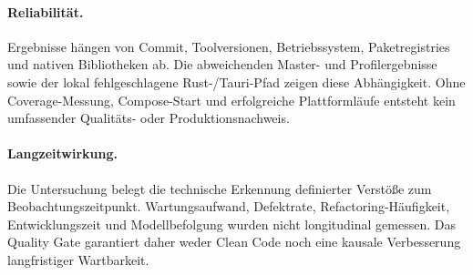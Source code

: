 \paragraph{Reliabilität.}
Ergebnisse hängen von Commit, Toolversionen, Betriebssystem, Paketregistries
und nativen Bibliotheken ab. Die abweichenden Master- und Profilergebnisse
sowie der lokal fehlgeschlagene Rust-/Tauri-Pfad zeigen diese Abhängigkeit.
Ohne Coverage-Messung, Compose-Start und erfolgreiche Plattformläufe entsteht
kein umfassender Qualitäts- oder Produktionsnachweis.

\paragraph{Langzeitwirkung.}
Die Untersuchung belegt die technische Erkennung definierter Verstöße zum
Beobachtungszeitpunkt. Wartungsaufwand, Defektrate, Refactoring-Häufigkeit,
Entwicklungszeit und Modellbefolgung wurden nicht longitudinal gemessen. Das
Quality Gate garantiert daher weder Clean Code noch eine kausale Verbesserung
langfristiger Wartbarkeit.
